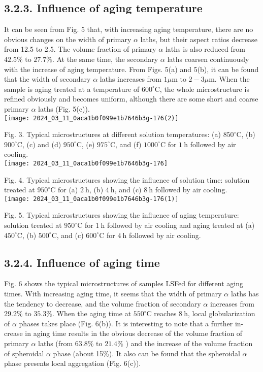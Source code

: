 \documentclass[10pt]{article}
\begin{document}
\subsection*{3.2.3. Influence of aging temperature}
It can be seen from Fig. 5 that, with increasing aging temperature, there are no obvious changes on the width of primary $\alpha$ laths, but their aspect ratios decrease from 12.5 to 2.5. The volume fraction of primary $\alpha$ laths is also reduced from $42.5 \%$ to $27.7 \%$. At the same time, the secondary $\alpha$ laths coarsen continuously with the increase of aging temperature. From Figs. 5(a) and 5(b), it can be found that the width of secondary $\alpha$ laths increases from $1 \mu \mathrm{m}$ to $2-3 \mu \mathrm{m}$. When the sample is aging treated at a temperature of $600^{\circ} \mathrm{C}$, the whole microstructure is refined obviously and becomes uniform, although there are some short and coarse primary $\alpha$ laths (Fig. 5(c)).\\
\texttt{[image: 2024\_03\_11\_0aca1b0f099e1b7646b3g-176(2)]}

Fig. 3. Typical microstructures at different solution temperatures: (a) $850^{\circ} \mathrm{C}$, (b) $900^{\circ} \mathrm{C}$, (c) and (d) $950^{\circ} \mathrm{C}$, (e) $975^{\circ} \mathrm{C}$, and (f) $1000^{\circ} \mathrm{C}$ for $1 \mathrm{~h}$ followed by air cooling.\\
\texttt{[image: 2024\_03\_11\_0aca1b0f099e1b7646b3g-176]}

Fig. 4. Typical microstructures showing the influence of solution time: solution treated at $950^{\circ} \mathrm{C}$ for (a) $2 \mathrm{~h}$, (b) $4 \mathrm{~h}$, and (c) $8 \mathrm{~h}$ followed by air cooling.\\
\texttt{[image: 2024\_03\_11\_0aca1b0f099e1b7646b3g-176(1)]}

Fig. 5. Typical microstructures showing the influence of aging temperature: solution treated at $950^{\circ} \mathrm{C}$ for $1 \mathrm{~h}$ followed by air cooling and aging treated at (a) $450^{\circ} \mathrm{C}$, (b) $500^{\circ} \mathrm{C}$, and (c) $600^{\circ} \mathrm{C}$ for $4 \mathrm{~h}$ followed by air cooling.

\subsection*{3.2.4. Influence of aging time}
Fig. 6 shows the typical microstructures of samples LSFed for different aging times. With increasing aging time, it seems that the width of primary $\alpha$ laths has the tendency to decrease, and the volume fraction of secondary $\alpha$ increases from $29.2 \%$ to $35.3 \%$. When the aging time at $550^{\circ} \mathrm{C}$ reaches $8 \mathrm{~h}$, local globularization of $\alpha$ phases takes place (Fig. 6(b)). It is interesting to note that a further in-\\
crease in aging time results in the obvious decrease of the volume fraction of primary $\alpha$ laths (from $63.8 \%$ to $21.4 \%$ ) and the increase of the volume fraction of spheroidal $\alpha$ phase (about 15\%). It also can be found that the spheroidal $\alpha$ phase presents local aggregation (Fig. 6(c)).
\end{document}
